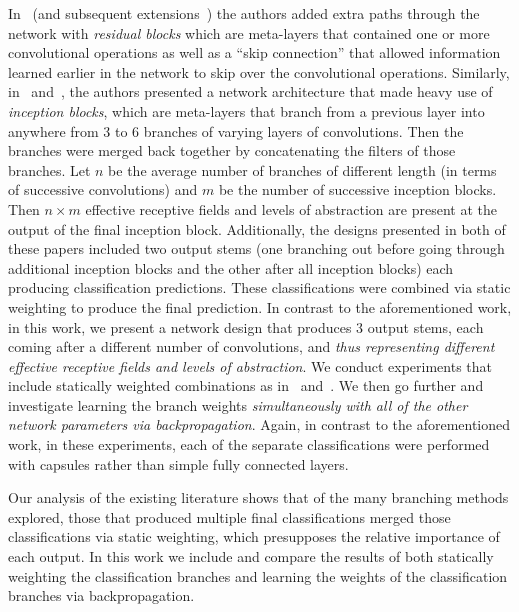 \documentclass{article}
\begin{document}
In~\cite{He2015} (and subsequent extensions~\cite{Srivastava2015}\cite{Xie2017}\cite{Jgou2017}\cite{Zhang2020}) the authors added extra paths through the network with \textit{residual blocks} which are meta-layers that contained one or more convolutional operations as well as a ``skip connection'' that allowed information learned earlier in the network to skip over the convolutional operations.  Similarly, in~\cite{Szegedy2015a} and~\cite{Szegedy2015b}, the authors presented a network architecture that made heavy use of \textit{inception blocks}, which are meta-layers that branch from a previous layer into anywhere from 3 to 6 branches of varying layers of convolutions.  Then the branches were merged back together by concatenating the filters of those branches.  Let \(n\) be the average number of branches of different length (in terms of successive convolutions) and \(m\) be the number of successive inception blocks.  Then \(n\times m\) effective receptive fields and levels of abstraction are present at the output of the final inception block.  Additionally, the designs presented in both of these papers included two output stems (one branching out before going through additional inception blocks and the other after all inception blocks) each producing classification predictions.  These classifications were combined via static weighting to produce the final prediction.  In contrast to the aforementioned work, in this work, we present a network design that produces 3 output stems, each coming after a different number of convolutions, and \textit{thus representing different effective receptive fields and levels of abstraction}.  We conduct experiments that include statically weighted combinations as in~\cite{Szegedy2015a} and~\cite{Szegedy2015b}.  We then go further and investigate learning the branch weights \textit{simultaneously with all of the other network parameters via backpropagation}.  Again, in contrast to the aforementioned work, in these experiments, each of the separate classifications were performed with capsules rather than simple fully connected layers.

Our analysis of the existing literature shows that of the many branching methods explored, those that produced multiple final classifications merged those classifications via static weighting, which presupposes the relative importance of each output.  In this work we include and compare the results of both statically weighting the classification branches and learning the weights of the classification branches via backpropagation.
\end{document}
